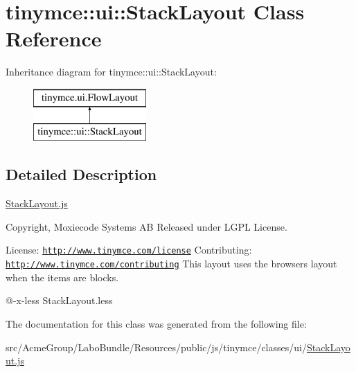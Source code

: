 \hypertarget{classtinymce_1_1ui_1_1_stack_layout}{\section{tinymce\+:\+:ui\+:\+:Stack\+Layout Class Reference}
\label{classtinymce_1_1ui_1_1_stack_layout}
}
Inheritance diagram for tinymce\+:\+:ui\+:\+:Stack\+Layout\+:\begin{figure}[H]
\begin{center}
\leavevmode
\includegraphics[height=2.000000cm]{classtinymce_1_1ui_1_1_stack_layout}
\end{center}
\end{figure}


\subsection{Detailed Description}
\hyperlink{_stack_layout_8js}{Stack\+Layout.\+js}

Copyright, Moxiecode Systems A\+B Released under L\+G\+P\+L License.

License\+: \href{http://www.tinymce.com/license}{\tt http\+://www.\+tinymce.\+com/license} Contributing\+: \href{http://www.tinymce.com/contributing}{\tt http\+://www.\+tinymce.\+com/contributing} This layout uses the browsers layout when the items are blocks.

@-\/x-\/less Stack\+Layout.\+less 

The documentation for this class was generated from the following file\+:\begin{DoxyCompactItemize}
\item 
src/\+Acme\+Group/\+Labo\+Bundle/\+Resources/public/js/tinymce/classes/ui/\hyperlink{_stack_layout_8js}{Stack\+Layout.\+js}\end{DoxyCompactItemize}
